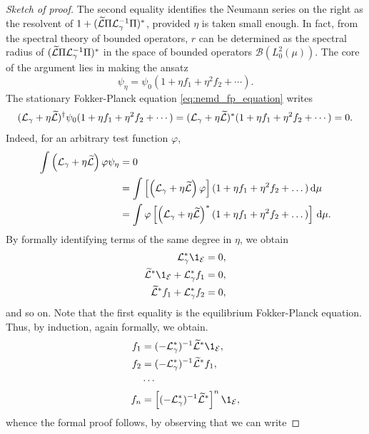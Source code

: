 \begin{proof}[Sketch of proof]
    The second equality identifies the Neumann series on the right as the resolvent of $1+(\widetilde{\mathcal{L}} \Pi \mathcal{L}_\gamma^{-1}\Pi)^*$, provided $\eta$ is taken small enough.
    In fact, from the spectral theory of bounded operators, $r$ can be determined as the spectral radius of $(\widetilde{\mathcal{L}} \Pi \mathcal{L}_\gamma^{-1}\Pi)^*$ in the space of bounded operators $\mathcal{B}(L^2_0(\mu))$.
    The core of the argument lies in making the ansatz
    \begin{equation}
        \label{eq:nemd_measure_ansatz}
        \psi_\eta=\psi_0(1+\eta f_1+\eta^2 f_2+\dotsm).
    \end{equation}
    The stationary Fokker-Planck equation \eqref{eq:nemd_fp_equation} writes
    \[(\mathcal{L}_\gamma +\eta \widetilde{\mathcal{L}})^{\dagger}\psi_0(1+\eta f_1+\eta^2 f_2+\dotsm)=(\mathcal{L}_\gamma +\eta \widetilde{\mathcal{L}})^{*}(1+\eta f_1+\eta^2 f_2+\dotsm)=0.\]
    Indeed, for an arbitrary test function $\varphi$,
    \begin{align*}
        \int \left(\mathcal{L}_\gamma +\eta \widetilde{\mathcal{L}}\right)\varphi \psi_\eta &=0\\
        &=\int \left[\left(\mathcal{L}_\gamma +\eta \widetilde{\mathcal{L}}\right)\varphi\right](1+\eta f_1+\eta^2 f_2+\dots)\,\mathrm{d} \mu\\
        &=\int \varphi \left[\left(\mathcal{L}_\gamma +\eta \widetilde{\mathcal{L}}\right)^*(1+\eta f_1+\eta^2 f_2+\dots)\right]\,\mathrm{d} \mu.
    \end{align*}
    By formally identifying terms of the same degree in $\eta$, we obtain
    \begin{align*}
        \cL_\gamma^* \1_\mathcal E&=0,\\
        \widetilde{\cL}^*\1_{\mathcal E}+\cL_\gamma^*f_1&=0,\\
        \widetilde{\cL}^*f_1+\cL_\gamma^*f_2&=0,
    \end{align*}
    and so on. Note that the first equality is the equilibrium Fokker-Planck equation.
    Thus, by induction, again formally, we obtain.
    \begin{align*}
        f_1 &= (-\cL_\gamma^*)^{-1}\widetilde{\cL}^*\1_{\mathcal E},\\
        f_2 &= (-\cL_\gamma^*)^{-1}\widetilde{\cL}^*f_1,\\
        &\dotsm\\
        f_n &= \left[(-\cL_\gamma^*)^{-1}\widetilde{\cL}^*\right]^{n}\1_{\mathcal E},
    \end{align*}
    whence the formal proof follows, by observing that we can write 

\end{proof}
